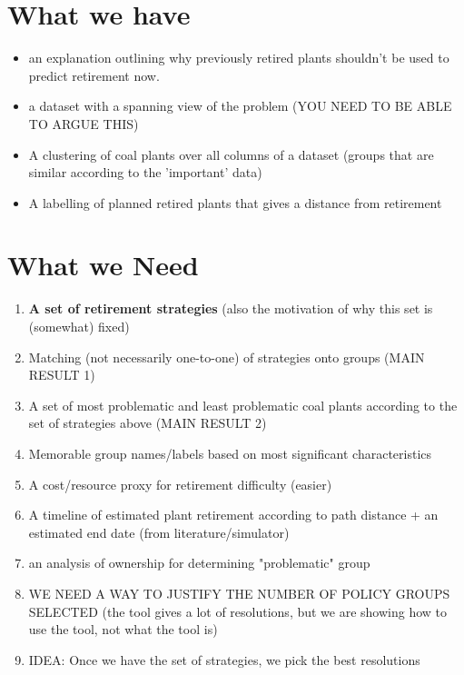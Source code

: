 
\section{What we have}
\begin{itemize}
    \item an explanation outlining why previously retired plants shouldn't be used to predict retirement now.
    \item a dataset with a spanning view of the problem (YOU NEED TO BE ABLE TO ARGUE THIS) 
    \item A clustering of coal plants over all columns of a dataset (groups that are similar according to the 'important' data) 
    \item A labelling of planned retired plants that gives a distance from retirement 
\end{itemize}

\section{What we Need}
\begin{enumerate}
     \item \textbf{A set of retirement strategies} (also the motivation of why this set is (somewhat) fixed) 
     \item Matching (not necessarily one-to-one) of strategies onto groups (MAIN RESULT 1)
     \item A set of most problematic and least problematic coal plants according to the set of strategies above (MAIN RESULT 2) 
     \item Memorable group names/labels based on most significant characteristics
     \item A cost/resource proxy for retirement difficulty (easier) 
     \item A timeline of estimated plant retirement according to path distance + an estimated end date (from literature/simulator) 
     \item an analysis of ownership for determining "problematic" group 
     \item WE NEED A WAY TO JUSTIFY THE NUMBER OF POLICY GROUPS SELECTED (the tool gives a lot of resolutions, but we are showing how to use the tool, not what the tool is)
     \item IDEA: Once we have the set of strategies, we pick the best resolutions
\end{enumerate}

